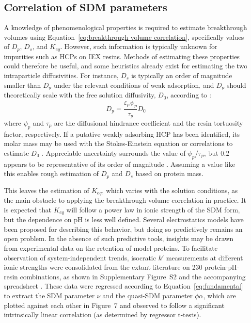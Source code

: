\documentclass[preprint,review,12pt]{elsarticle}
\begin{document}
    \subsection{Correlation of SDM parameters} \label{ssec:thermo corr}

        A knowledge of phenomenological properties is required to estimate breakthrough volumes using Equation~\ref{eq:breakthrough volume correlation}, specifically values of $D_p$, $D_s$, and $K_{eq}$. However, such information is typically unknown for impurities such as HCPs on IEX resins. Methods of estimating these properties could therefore be useful, and some heuristics already exist for estimating the two intraparticle diffusivities. For instance, $D_s$ is typically an order of magnitude smaller than $D_p$ under the relevant conditions of weak adsorption, and $D_p$ should theoretically scale with the free solution diffusivity, $D_0$, according to \cite{Carta2010a}:
        \begin{equation} \label{eq:tortuosity relationship}
            D_p = \frac{\varepsilon_p \psi_p}{\tau_p} D_0
        \end{equation}
        where $\psi_p$ and $\tau_p$ are the diffusional hindrance coefficient and the resin tortuosity factor, respectively. If a putative weakly adsorbing HCP has been identified, its molar mass may be used with the Stokes-Einstein equation or correlations to estimate $D_0$ \cite{Young1980}. Appreciable uncertainty surrounds the value of $\psi_p$/$\tau_p$, but 0.2 appears to be representative of its order of magnitude \cite{Angelo2016b}. Assuming a value like this enables rough estimation of $D_p$ and $D_s$ based on protein mass.



        This leaves the estimation of $K_{eq}$, which varies with the solution conditions, as the main obstacle to applying the breakthrough volume correlation in practice. It is expected that $K_{eq}$ will follow a power law in ionic strength of the SDM form, but the dependence on pH is less well defined. Several electrostatics models have been proposed for describing this behavior, but doing so predictively remains an open problem. In the absence of such predictive tools, insights may be drawn from experimental data on the retention of model proteins. To facilitate observation of system-independent trends, isocratic $k'$ measurements at different ionic strengths were consolidated from the extant literature on 230 protein-pH-resin combinations, as shown in Supplementary Figure~S2 and the accompanying spreadsheet \cite{Staby2000, Staby2001, Staby2004, Staby2005, Staby2006, Staby2007, DePhillips2001, DePhillips2004, Kumar2015, bai1999}. These data were regressed according to Equation~\ref{eq:fundamental} to extract the SDM parameter $\nu$ and the quasi-SDM parameter $\phi \alpha$, which are plotted against each other in Figure~7 and observed to follow a significant intrinsically linear correlation (as determined by regressor t-tests).
\end{document}
